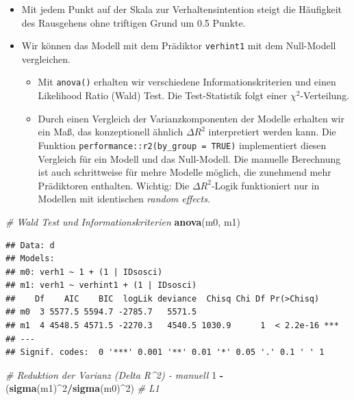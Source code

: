 \documentclass[
]{book}
\newenvironment{Shaded}{\begin{snugshade}}{\end{snugshade}}
\newcommand{\CommentTok}[1]{\textcolor[rgb]{0.56,0.35,0.01}{\textit{#1}}}
\newcommand{\DecValTok}[1]{\textcolor[rgb]{0.00,0.00,0.81}{#1}}
\newcommand{\KeywordTok}[1]{\textcolor[rgb]{0.13,0.29,0.53}{\textbf{#1}}}
\newcommand{\NormalTok}[1]{#1}
\newcommand{\OperatorTok}[1]{\textcolor[rgb]{0.81,0.36,0.00}{\textbf{#1}}}
\newcommand{\StringTok}[1]{\textcolor[rgb]{0.31,0.60,0.02}{#1}}
\providecommand{\tightlist}{%
  \setlength{\itemsep}{0pt}\setlength{\parskip}{0pt}}
\begin{document}
\begin{itemize}
\item
  Mit jedem Punkt auf der Skala zur Verhaltensintention steigt die Häufigkeit des Rausgehens ohne triftigen Grund um 0.5 Punkte.
\item
  Wir können das Modell mit dem Prädiktor \texttt{verhint1} mit dem Null-Modell vergleichen.

  \begin{itemize}
  \tightlist
  \item
    Mit \texttt{anova()} erhalten wir verschiedene Informationskriterien und einen Likelihood Ratio (Wald) Test. Die Test-Statistik folgt einer \(\chi^2\)-Verteilung.
  \item
    Durch einen Vergleich der Varianzkomponenten der Modelle erhalten wir ein Maß, das konzeptionell ähnlich \(\Delta R^2\) interpretiert werden kann. Die Funktion \texttt{performance::r2(by\_group\ =\ TRUE)} implementiert diesen Vergleich für ein Modell und das Null-Modell. Die manuelle Berechnung ist auch schrittweise für mehre Modelle möglich, die zunehmend mehr Prädiktoren enthalten. Wichtig: Die \(\Delta R^2\)-Logik funktioniert nur in Modellen mit identischen \emph{random effects}.
  \end{itemize}
\end{itemize}

\begin{Shaded}
\begin{Highlighting}[]
\CommentTok{# Wald Test und Informationskriterien}
\KeywordTok{anova}\NormalTok{(m0, m1)}
\end{Highlighting}
\end{Shaded}

\begin{verbatim}
## Data: d
## Models:
## m0: verh1 ~ 1 + (1 | IDsosci)
## m1: verh1 ~ verhint1 + (1 | IDsosci)
##    Df    AIC    BIC  logLik deviance  Chisq Chi Df Pr(>Chisq)    
## m0  3 5577.5 5594.7 -2785.7   5571.5                             
## m1  4 4548.5 4571.5 -2270.3   4540.5 1030.9      1  < 2.2e-16 ***
## ---
## Signif. codes:  0 '***' 0.001 '**' 0.01 '*' 0.05 '.' 0.1 ' ' 1
\end{verbatim}

\begin{Shaded}
\begin{Highlighting}[]
\CommentTok{# Reduktion der Varianz (Delta R^2) - manuell}
\DecValTok{1} \OperatorTok{-}\StringTok{ }\NormalTok{(}\KeywordTok{sigma}\NormalTok{(m1)}\OperatorTok{^}\DecValTok{2}\OperatorTok{/}\KeywordTok{sigma}\NormalTok{(m0)}\OperatorTok{^}\DecValTok{2}\NormalTok{)  }\CommentTok{# L1}
\end{Highlighting}
\end{Shaded}
\end{document}
